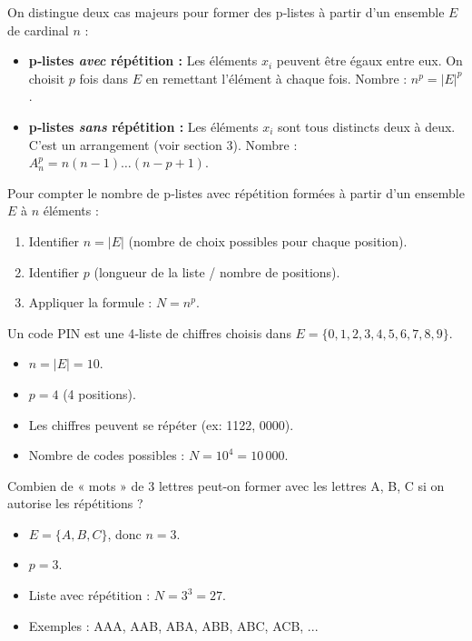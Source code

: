 \documentclass[11pt]{article}
\newcommand{\cle}[1]{{\popxbold\color{popdark}#1}}
\begin{document}
\begin{aretenir}
On distingue deux cas majeurs pour former des p‑listes à partir d'un ensemble $E$ de cardinal $n$ :
\begin{itemize}
    \item \textbf{p‑listes \emph{avec} répétition :} Les éléments $x_i$ peuvent être égaux entre eux. On choisit $p$ fois dans $E$ en remettant l'élément à chaque fois. Nombre : $n^p = |E|^p$.
    \item \textbf{p‑listes \emph{sans} répétition :} Les éléments $x_i$ sont tous distincts deux à deux. C'est un \cle{arrangement} (voir section 3). Nombre : $A_n^p = n(n-1)\dots(n-p+1)$.
\end{itemize}
\end{aretenir}

\begin{methode}
Pour compter le nombre de p‑listes avec répétition formées à partir d'un ensemble $E$ à $n$ éléments :
\begin{enumerate}
    \item Identifier $n = |E|$ (nombre de choix possibles pour chaque position).
    \item Identifier $p$ (longueur de la liste / nombre de positions).
    \item Appliquer la formule : $\boxed{N = n^p}$.
\end{enumerate}
\end{methode}

\begin{exemplebox}
Un code PIN est une 4‑liste de chiffres choisis dans $E = \{0,1,2,3,4,5,6,7,8,9\}$.
\begin{itemize}
    \item $n = |E| = 10$.
    \item $p = 4$ (4 positions).
    \item Les chiffres peuvent se répéter (ex: 1122, 0000).
    \item Nombre de codes possibles : $N = 10^4 = 10\,000$.
\end{itemize}
\end{exemplebox}

\begin{exemplebox}
Combien de « mots » de 3 lettres peut-on former avec les lettres A, B, C si on autorise les répétitions ?
\begin{itemize}
    \item $E = \{A, B, C\}$, donc $n = 3$.
    \item $p = 3$.
    \item Liste avec répétition : $N = 3^3 = 27$.
    \item Exemples : AAA, AAB, ABA, ABB, ABC, ACB, ...
\end{itemize}
\end{exemplebox}
\end{document}
